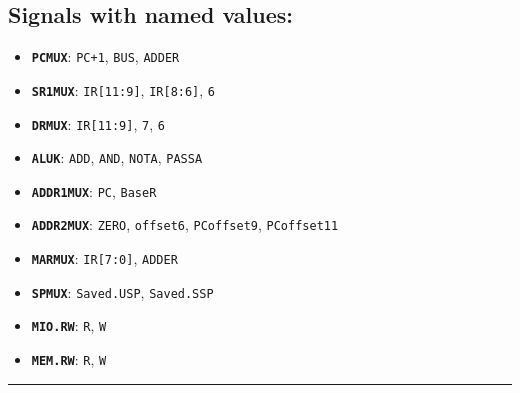 \begin{minipage}{0.65\linewidth}
\subsection*{Signals with named values:}
\Large
\begin{itemize}
    \item \textbf{\texttt{PCMUX}}: \texttt{PC+1}, \texttt{BUS}, \texttt{ADDER}
    \item \textbf{\texttt{SR1MUX}}: \texttt{IR[11:9]}, \texttt{IR[8:6]}\ifio, \texttt{6}\fi
    \item \textbf{\texttt{DRMUX}}: \texttt{IR[11:9]}, \texttt{7}\ifio, \texttt{6}\fi
    \item \textbf{\texttt{ALUK}}: \texttt{ADD}, \texttt{AND}, \texttt{NOTA}, \texttt{PASSA}
    \item \textbf{\texttt{ADDR1MUX}}: \texttt{PC}, \texttt{BaseR}
    \item \textbf{\texttt{ADDR2MUX}}: \texttt{ZERO}, \texttt{offset6}, \texttt{PCoffset9}, \allowbreak \texttt{PCoffset11}
    \ifio
        \item \textbf{\texttt{MARMUX}}: \texttt{IR[7:0]}, \texttt{ADDER}
        \item \textbf{\texttt{SPMUX}}: \texttt{Saved.USP}, \texttt{Saved.SSP}
        \item \textbf{\texttt{MIO.RW}}: \texttt{R}, \texttt{W}
    \else
        \item \textbf{\texttt{MEM.RW}}: \texttt{R}, \texttt{W}
    \fi
\end{itemize}
\end{minipage}

\vspace{1em}
\hrule
\centering
